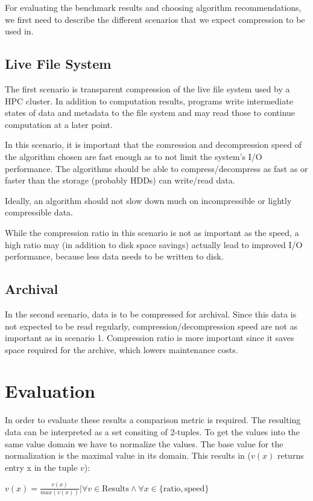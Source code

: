 \documentclass[
	12pt,
	a4paper,
	BCOR10mm,
	DIV14,
	listof=totoc,
	bibliography=totoc,
	headsepline
]{scrreprt}
\begin{document}
For evaluating the benchmark results and choosing algorithm recommendations, we first need to describe the different scenarios that we expect compression to be used in.

\subsection{Live File System}

The first scenario is transparent compression of the live file system used by a HPC cluster. In addition to computation results, programs write intermediate states of data and metadata to the file system and may read those to continue computation at a later point.

In this scenario, it is important that the comression and decompression speed of the algorithm chosen are fast enough as to not limit the system's I/O performance.  The algorithms should be able to compress/decompress as fast as or faster than the storage (probably HDDs) can write/read data.

Ideally, an algorithm should not slow down much on incompressible or lightly compressible data.

While the compression ratio in this scenario is not as important as the speed, a high ratio may (in addition to disk space savings) actually lead to improved I/O performance, because less data needs to be written to disk.

\subsection{Archival}

In the second scenario, data is to be compressed for archival. Since this data is not expected to be read regularly, compression/decompression speed are not as important as in scenario 1. Compression ratio is more important since it saves space required for the archive, which lowers maintenance costs.

\section{Evaluation}
In order to evaluate these results a comparison metric is required.
The resulting data can be interpreted as a set consiting of 2-tuples.
To get the values into the same value domain we have to normalize the values.
The base value for the normalization is the maximal value in its domain.
This results in (\(v(x)\) returns entry x in the tuple \(v\)):
\begin{center}
	\(
	   v(x) = \frac{v(x)}{max(v(x))}|\forall v \in \text{Results} \land \forall x \in \{\text{ratio}, \text{speed}\}
	\)
\end{center}
\end{document}
